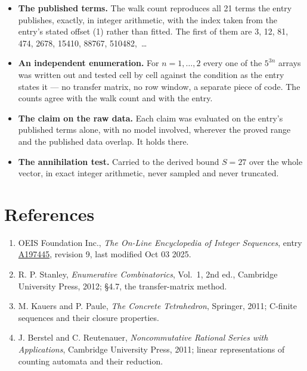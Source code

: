 \documentclass[11pt]{article}
\theoremstyle{definition}
\begin{document}
\begin{itemize}

\item {\bfseries The published terms.} The walk count reproduces all 21 terms the entry publishes, exactly, in integer arithmetic, with the index taken from the entry's stated offset (1) rather than fitted. The first of them are 3, 12, 81, 474, 2678, 15410, 88767, 510482,~\dots

\item {\bfseries An independent enumeration.} For $n = 1,\dots,2$ every one of the $5^{3n}$ arrays was written out and tested cell by cell against the condition as the entry states it --- no transfer matrix, no row window, a separate piece of code. The counts agree with the walk count and with the entry.

\item {\bfseries The claim on the raw data.} Each claim was evaluated on the entry's published terms alone, with no model involved, wherever the proved range and the published data overlap. It holds there.

\item {\bfseries The annihilation test.} Carried to the derived bound $S = 27$ over the whole vector, in exact integer arithmetic, never sampled and never truncated.

\end{itemize}

\section{References}

\begin{enumerate}

\item OEIS Foundation Inc., \emph{The On-Line Encyclopedia of Integer Sequences}, entry \href{https://oeis.org/A197445}{A197445}, revision 9, last modified Oct 03 2025.

\item R. P. Stanley, \emph{Enumerative Combinatorics}, Vol.~1, 2nd ed., Cambridge University Press, 2012; \S4.7, the transfer-matrix method.

\item M. Kauers and P. Paule, \emph{The Concrete Tetrahedron}, Springer, 2011; C-finite sequences and their closure properties.

\item J. Berstel and C. Reutenauer, \emph{Noncommutative Rational Series with Applications}, Cambridge University Press, 2011; linear representations of counting automata and their reduction.

\end{enumerate}
\end{document}
